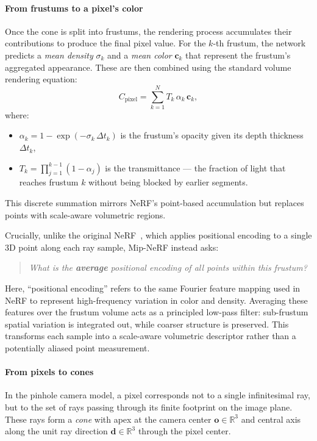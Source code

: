 \begin{enrichment}
\begin{enrichment}
    \newpage
    
    \paragraph{From frustums to a pixel’s color}  
    Once the cone is split into frustums, the rendering process accumulates their contributions to produce the final pixel value. For the $k$-th frustum, the network predicts a \emph{mean density} $\sigma_k$ and a \emph{mean color} $\mathbf{c}_k$ that represent the frustum’s aggregated appearance. These are then combined using the standard volume rendering equation:
    \[
    C_{\text{pixel}} = \sum_{k=1}^N T_k \, \alpha_k \, \mathbf{c}_k ,
    \]
    where:
    \begin{itemize}
        \item $\alpha_k = 1 - \exp(-\sigma_k \, \Delta t_k)$ is the frustum’s opacity given its depth thickness $\Delta t_k$,
        \item $T_k = \prod_{j=1}^{k-1} (1 - \alpha_j)$ is the transmittance — the fraction of light that reaches frustum $k$ without being blocked by earlier segments.
    \end{itemize}
    This discrete summation mirrors NeRF’s point-based accumulation but replaces points with scale-aware volumetric regions.
    
    Crucially, unlike the original NeRF~\cite{mildenhall2020_nerf}, which applies positional encoding to a single 3D point along each ray sample, Mip-NeRF instead asks:
    \begin{quote}
        \emph{What is the \textbf{average} positional encoding of all points within this frustum?}
    \end{quote}
    Here, ``positional encoding'' refers to the same Fourier feature mapping used in NeRF to represent high-frequency variation in color and density. Averaging these features over the frustum volume acts as a principled low-pass filter: sub-frustum spatial variation is integrated out, while coarser structure is preserved. This transforms each sample into a scale-aware volumetric descriptor rather than a potentially aliased point measurement.
    
    \paragraph{From pixels to cones}  
    In the pinhole camera model, a pixel corresponds not to a single infinitesimal ray, but to the set of rays passing through its finite footprint on the image plane.  
    These rays form a \emph{cone} with apex at the camera center \( \mathbf{o} \in \mathbb{R}^3 \) and central axis along the unit ray direction \( \mathbf{d} \in \mathbb{R}^3 \) through the pixel center.
    

\end{enrichment}
\end{enrichment}
